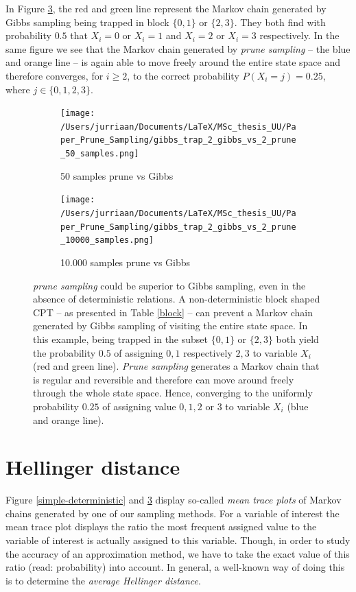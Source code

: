 \documentclass[a4paper, twoside, 11pt]{report}
\theoremstyle{plain}
\theoremstyle{definition}
\theoremstyle{remark}
\newcommand{\ps}{\textit{prune sampling }}
\begin{document}
In Figure \ref{block-BN}, the red and green line represent the Markov chain generated by Gibbs sampling being trapped in block $\{0, 1\}$ or $\{2,3\}$. They both find with probability $0.5$ that $X_i = 0$ or $X_i = 1$ and $X_i = 2$ or $X_i = 3$ respectively. In the same figure we see that the Markov chain generated by \ps -- the blue and orange line -- is again able to move freely around the entire state space and therefore converges, for $i \geq 2$, to the correct probability $P(X_i = j)= 0.25$, where $j \in \{0,1,2,3\}$.
\begin{figure}[h]
\centering
\begin{subfigure}{.49\textwidth}
  \centering
  \texttt{[image: /Users/jurriaan/Documents/LaTeX/MSc\_thesis\_UU/Paper\_Prune\_Sampling/gibbs\_trap\_2\_gibbs\_vs\_2\_prune\_50\_samples.png]}
  \caption{50 samples prune vs Gibbs}
  \label{fig:sub1}
\end{subfigure}
\begin{subfigure}{.49\textwidth}
  \centering
  \texttt{[image: /Users/jurriaan/Documents/LaTeX/MSc\_thesis\_UU/Paper\_Prune\_Sampling/gibbs\_trap\_2\_gibbs\_vs\_2\_prune\_10000\_samples.png]}
  \caption{10.000 samples prune vs Gibbs}
  \label{fig:sub2}
\end{subfigure}
\vspace{0.75pc}
\caption{\ps could be superior to Gibbs sampling, even in the absence of deterministic relations. A non-deterministic block shaped CPT -- as presented in Table \ref{block} -- can prevent a Markov chain generated by Gibbs sampling of visiting the entire state space. In this example, being trapped in the subset $\{0, 1\}$ or $\{2, 3\}$ both yield the probability $0.5$ of assigning $0,1$ respectively $2,3$ to variable $X_i$ (red and green line). \textit{Prune sampling} generates a Markov chain that is regular and reversible and therefore can move around freely through the whole state space. Hence, converging to the uniformly probability $0.25$ of assigning value $0,1,2$ or $3$ to variable $X_i$ (blue and orange line).} 
\label{block-BN}
\end{figure}

\section{Hellinger distance}
Figure \ref{simple-deterministic} and \ref{block-BN} display so-called \textit{mean trace plots} of Markov chains generated by one of our sampling methods. For a variable of interest the mean trace plot displays the ratio the most frequent assigned value to the variable of interest is actually assigned to this variable. Though, in order to study the accuracy of an approximation method, we have to take the exact value of this ratio (read: probability) into account. In general, a well-known way of doing this is to determine the \textit{average Hellinger distance}. \\
\end{document}
